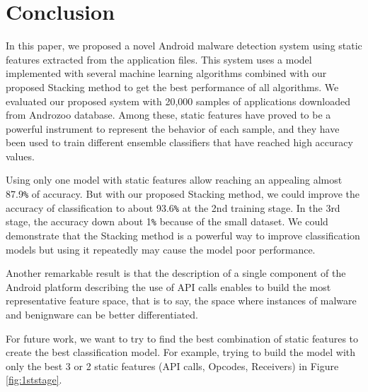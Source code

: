 \chapter{Conclusion}

In this paper, we proposed a novel Android malware detection system using static features extracted from the application files. This system uses a model implemented with several machine learning algorithms combined with our proposed Stacking method to get the best performance of all algorithms. We evaluated our proposed system with 20,000 samples of applications downloaded from Androzoo \cite{androzoo} database.
Among these, static features have proved to be a powerful instrument to represent the behavior of each sample, and they have been used to train different ensemble classifiers that have reached high accuracy values. 

Using only one model with static features allow reaching an appealing almost 87.9\verb+%+ of accuracy. 
But with our proposed Stacking method, we could improve the accuracy of classification to about 93.6\verb+%+ at the 2nd training stage.
In the 3rd stage, the accuracy down about 1\verb+%+ because of the small dataset.
We could demonstrate that the Stacking method is a powerful way to improve classification models but using it repeatedly may cause the model poor performance. 

Another remarkable result is that the description of a single component of the Android platform describing the use of API calls enables to build the most representative feature space, that is to say, the space
where instances of malware and benignware can be better differentiated.

For future work, we want to try to find the best combination of static features to create the best classification model. For example, trying to build the model with only the best 3 or 2 static features (API calls, Opcodes, Receivers) in Figure \ref{fig:1ststage}.
